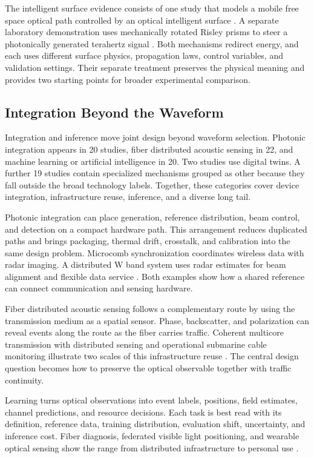 The intelligent surface evidence consists of one study that models a mobile
free space optical path controlled by an optical intelligent surface
\cite{OISAC_SCR00914}. A separate laboratory demonstration uses mechanically
rotated Risley prisms to steer a photonically generated terahertz signal
\cite{OISAC_SCR00953}. Both mechanisms redirect energy, and each uses different
surface physics, propagation laws, control variables, and validation settings.
Their separate treatment preserves the physical meaning and provides two
starting points for broader experimental comparison.

\subsection{Integration Beyond the Waveform}

Integration and inference move joint design beyond waveform selection.
Photonic integration appears in 20 studies, fiber distributed acoustic sensing
in 22, and machine learning or artificial intelligence in 20. Two studies use
digital twins. A further 19 studies contain specialized mechanisms grouped as
other because they fall outside the broad technology labels. Together, these
categories cover device integration, infrastructure reuse, inference, and a
diverse long tail.

Photonic integration can place generation, reference distribution, beam
control, and detection on a compact hardware path. This arrangement reduces
duplicated paths and brings packaging, thermal drift, crosstalk, and calibration
into the same design problem. Microcomb synchronization coordinates wireless
data with radar imaging. A distributed W band system uses radar estimates for
beam alignment and flexible data service
\cite{OISAC_SCR00406,OISAC_SCR00502}. Both examples show how a shared reference
can connect communication and sensing hardware.

Fiber distributed acoustic sensing follows a complementary route by using the
transmission medium as a spatial sensor. Phase, backscatter, and polarization
can reveal events along the route as the fiber carries traffic. Coherent
multicore transmission with distributed sensing and operational submarine cable
monitoring illustrate two scales of this infrastructure reuse
\cite{OISAC_SCR00346,OISAC_SCR00957}. The central design question becomes how to
preserve the optical observable together with traffic continuity.

Learning turns optical observations into event labels, positions, field
estimates, channel predictions, and resource decisions. Each task is best read
with its definition, reference data, training distribution, evaluation shift,
uncertainty, and inference cost. Fiber diagnosis, federated visible light
positioning, and wearable optical sensing show the range from distributed
infrastructure to personal use
\cite{OISAC_SCR01006,OISAC_SCR01081,OISAC_SCR00376}.

